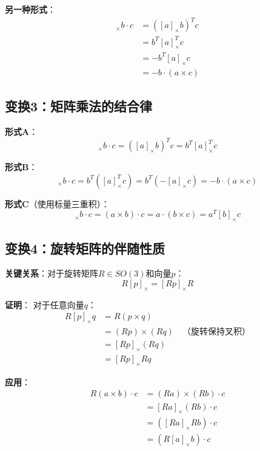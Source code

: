 \documentclass[12pt,a4paper]{article}
\begin{document}
\textbf{另一种形式}：
\begin{align}
[a]_{\times} b \cdot c &= ([a]_{\times} b)^T c \\
&= b^T [a]_{\times}^T c \\
&= -b^T [a]_{\times} c \\
&= -b \cdot (a \times c)
\end{align}

\subsection{变换3：矩阵乘法的结合律}

\textbf{形式A}：
\begin{equation}
[a]_{\times} b \cdot c = ([a]_{\times} b)^T c = b^T [a]_{\times}^T c
\end{equation}

\textbf{形式B}：
\begin{equation}
[a]_{\times} b \cdot c = b^T ([a]_{\times}^T c) = b^T (-[a]_{\times} c) = -b \cdot (a \times c)
\end{equation}

\textbf{形式C}（使用标量三重积）：
\begin{equation}
[a]_{\times} b \cdot c = (a \times b) \cdot c = a \cdot (b \times c) = a^T [b]_{\times} c
\end{equation}

\subsection{变换4：旋转矩阵的伴随性质}

\textbf{关键关系}：对于旋转矩阵$R \in SO(3)$和向量$p$：
\begin{equation}
R [p]_{\times} = [Rp]_{\times} R
\end{equation}

\textbf{证明}：
对于任意向量$q$：
\begin{align}
R [p]_{\times} q &= R (p \times q) \\
&= (Rp) \times (Rq) \quad \text{（旋转保持叉积）} \\
&= [Rp]_{\times} (Rq) \\
&= [Rp]_{\times} R q
\end{align}

\textbf{应用}：
\begin{align}
R (a \times b) \cdot c &= (Ra) \times (Rb) \cdot c \\
&= [Ra]_{\times} (Rb) \cdot c \\
&= ([Ra]_{\times} R b) \cdot c \\
&= (R [a]_{\times} b) \cdot c
\end{align}
\end{document}
